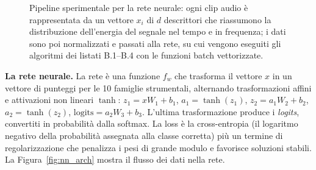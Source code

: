 \documentclass[italian, a4paper, twoside, binding=6mm]{sapthesis}
\begin{document}
\begin{figure}[H]
\centering
{}
\caption{Pipeline sperimentale per la rete neurale: ogni clip audio è
rappresentata da un vettore $x_i$ di $d$ descrittori che riassumono la
distribuzione dell'energia del segnale nel tempo e in frequenza; i dati sono
poi normalizzati e passati alla rete, su cui vengono eseguiti gli algoritmi
dei listati B.1--B.4 con le funzioni batch vettorizzate.}
\label{fig:nn_pipeline}
\end{figure}

\textbf{La rete neurale.} La rete è una funzione $f_w$ che trasforma il vettore
$x$ in un vettore di punteggi per le 10 famiglie strumentali, alternando
trasformazioni affini e attivazioni non lineari $\tanh$:
$z_1 = xW_1 + b_1$, $a_1 = \tanh(z_1)$, $z_2 = a_1 W_2 + b_2$,
$a_2 = \tanh(z_2)$, $\mathrm{logits} = a_2 W_3 + b_3$. L'ultima trasformazione
produce i \emph{logits}, convertiti in probabilità dalla softmax. La loss è la
cross-entropia (il logaritmo negativo della probabilità assegnata alla classe
corretta) più un termine di regolarizzazione che penalizza i pesi di grande
modulo e favorisce soluzioni stabili. La Figura~\ref{fig:nn_arch} mostra il
flusso dei dati nella rete.
\end{document}
